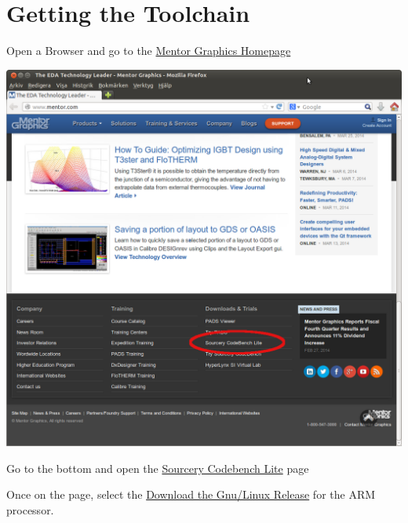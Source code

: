
\section{Getting the Toolchain}

Open a Browser and go to the \href{http://www.mentor.com/}{Mentor Graphics Homepage} \\
\begin{center}
  \includegraphics[width=\textwidth]{labs/codesourcery/Mentor_Homepage.png}
\end{center}

Go to the bottom and open the \href{http://www.mentor.com/embedded-software/sourcery-tools/sourcery-codebench/editions/lite-edition.html}{Sourcery Codebench Lite} page
\clearpage

Once on the page, select the \href{http://www.mentor.com/embedded-software/sourcery-tools/sourcery-codebench/editions/lite-edition/arm-gnu-linux.html}{Download the Gnu/Linux Release} for the ARM processor.
\\

